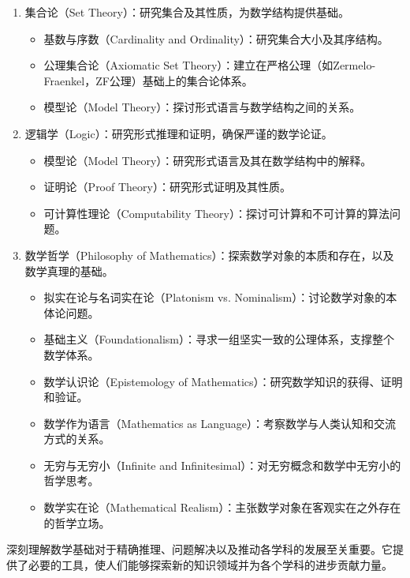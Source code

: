 \begin{enumerate}
  \item 集合论（Set Theory）：研究集合及其性质，为数学结构提供基础。
    \begin{itemize}
      \item 基数与序数（Cardinality and Ordinality）：研究集合大小及其序结构。
      \item 公理集合论（Axiomatic Set Theory）：建立在严格公理（如Zermelo-Fraenkel，ZF公理）基础上的集合论体系。
      \item 模型论（Model Theory）：探讨形式语言与数学结构之间的关系。
    \end{itemize}
    
  \item 逻辑学（Logic）：研究形式推理和证明，确保严谨的数学论证。
    \begin{itemize}
      \item 模型论（Model Theory）：研究形式语言及其在数学结构中的解释。
      \item 证明论（Proof Theory）：研究形式证明及其性质。
      \item 可计算性理论（Computability Theory）：探讨可计算和不可计算的算法问题。
    \end{itemize}
    
  \item 数学哲学（Philosophy of Mathematics）：探索数学对象的本质和存在，以及数学真理的基础。
    \begin{itemize}
      \item 拟实在论与名词实在论（Platonism vs. Nominalism）：讨论数学对象的本体论问题。
      \item 基础主义（Foundationalism）：寻求一组坚实一致的公理体系，支撑整个数学体系。
      \item 数学认识论（Epistemology of Mathematics）：研究数学知识的获得、证明和验证。
      \item 数学作为语言（Mathematics as Language）：考察数学与人类认知和交流方式的关系。
      \item 无穷与无穷小（Infinite and Infinitesimal）：对无穷概念和数学中无穷小的哲学思考。
      \item 数学实在论（Mathematical Realism）：主张数学对象在客观实在之外存在的哲学立场。
    \end{itemize}
\end{enumerate}

深刻理解数学基础对于精确推理、问题解决以及推动各学科的发展至关重要。它提供了必要的工具，使人们能够探索新的知识领域并为各个学科的进步贡献力量。
